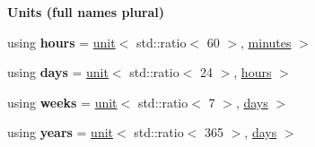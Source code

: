 \begin{Indent}{\bf Units (full names plural)}
\begin{DoxyCompactItemize}
\item 
\hypertarget{namespaceunits_1_1time_a070807565fd520a82ec1f538b301813f}{}using {\bfseries hours} = \hyperlink{structunits_1_1unit}{unit}$<$ std\+::ratio$<$ 60 $>$, \hyperlink{structunits_1_1unit}{minutes} $>$\label{namespaceunits_1_1time_a070807565fd520a82ec1f538b301813f}

\item 
\hypertarget{namespaceunits_1_1time_a9440ab16feb74da21a83043b07a5c901}{}using {\bfseries days} = \hyperlink{structunits_1_1unit}{unit}$<$ std\+::ratio$<$ 24 $>$, \hyperlink{structunits_1_1unit}{hours} $>$\label{namespaceunits_1_1time_a9440ab16feb74da21a83043b07a5c901}

\item 
\hypertarget{namespaceunits_1_1time_a42dbcb4d90e58d2c7e3c6c3d77781a67}{}using {\bfseries weeks} = \hyperlink{structunits_1_1unit}{unit}$<$ std\+::ratio$<$ 7 $>$, \hyperlink{structunits_1_1unit}{days} $>$\label{namespaceunits_1_1time_a42dbcb4d90e58d2c7e3c6c3d77781a67}

\item 
\hypertarget{namespaceunits_1_1time_a44b2ac1a7a30ecef8dc8aaf3c7589250}{}using {\bfseries years} = \hyperlink{structunits_1_1unit}{unit}$<$ std\+::ratio$<$ 365 $>$, \hyperlink{structunits_1_1unit}{days} $>$\label{namespaceunits_1_1time_a44b2ac1a7a30ecef8dc8aaf3c7589250}

\end{DoxyCompactItemize}
\end{Indent}
